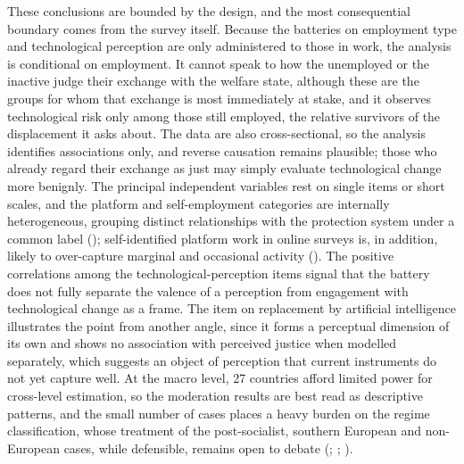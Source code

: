 \documentclass[
  12pt,
]{article}
\begin{document}
These conclusions are bounded by the design, and the most consequential
boundary comes from the survey itself. Because the batteries on
employment type and technological perception are only administered to
those in work, the analysis is conditional on employment. It cannot
speak to how the unemployed or the inactive judge their exchange with
the welfare state, although these are the groups for whom that exchange
is most immediately at stake, and it observes technological risk only
among those still employed, the relative survivors of the displacement
it asks about. The data are also cross-sectional, so the analysis
identifies associations only, and reverse causation remains plausible;
those who already regard their exchange as just may simply evaluate
technological change more benignly. The principal independent variables
rest on single items or short scales, and the platform and
self-employment categories are internally heterogeneous, grouping
distinct relationships with the protection system under a common label
();
self-identified platform work in online surveys is, in addition, likely
to over-capture marginal and occasional activity
(). The positive correlations
among the technological-perception items signal that the battery does
not fully separate the valence of a perception from engagement with
technological change as a frame. The item on replacement by artificial
intelligence illustrates the point from another angle, since it forms a
perceptual dimension of its own and shows no association with perceived
justice when modelled separately, which suggests an object of perception
that current instruments do not yet capture well. At the macro level, 27
countries afford limited power for cross-level estimation, so the
moderation results are best read as descriptive patterns, and the small
number of cases places a heavy burden on the regime classification,
whose treatment of the post-socialist, southern European and
non-European cases, while defensible, remains open to debate
(;
;
).
\end{document}
